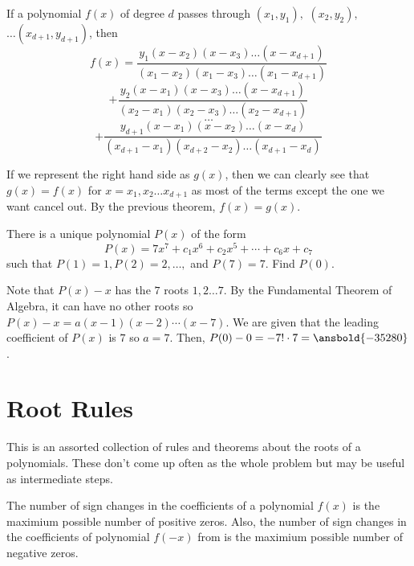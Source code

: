 \documentclass{article}
\begin{document}
\begin{theo}
If a polynomial $f(x)$ of degree $d$ passes through $(x_{1},y_{1}),$ $(x_{2},y_{2}),$ $\ldots (x_{d+1},y_{d+1})$, then
$$f(x)=\frac{y_{1}(x-x_{2})(x-x_{3})\ldots (x-x_{d+1})}{(x_{1}-x_{2})(x_{1}-x_{3})\ldots (x_{1}-x_{d+1})}$$
$$+\frac{y_{2}(x-x_{1})(x-x_{3})\ldots (x-x_{d+1})}{(x_{2}-x_{1})(x_{2}-x_{3})\ldots (x_{2}-x_{d+1})}$$
$$\ldots$$
$$+\frac{y_{d+1}(x-x_{1})(x-x_{2})\ldots (x-x_{d})}{(x_{d+1}-x_{1})(x_{d+2}-x_{2})\ldots (x_{d+1}-x_{d})}$$
\end{theo}

\begin{pro}
If we represent the right hand side as $g(x)$, then we can clearly see that $g(x)=f(x)$ for $x=x_{1},x_{2}\ldots x_{d+1}$ as most of the terms except the one we want cancel out. By the previous theorem, $f(x)=g(x)$.
\end{pro}

\begin{exam}[Mandelbrot]
There is a unique polynomial $P(x)$ of the form 
$$P(x)=7x^7+c_{1}x^6+c_{2}x^{5}+\cdots + c_{6}x+c_{7}$$
such that $P(1)=1,P(2)=2, \ldots,$ and $P(7)=7$. Find $P(0)$.
\end{exam}

\begin{sol}
Note that $P(x)-x$ has the $7$ roots $1,2\ldots 7$. By the Fundamental Theorem of Algebra, it can have no other roots so $P(x)-x=a(x-1)(x-2)\cdots(x-7)$. We are given that the leading coefficient of $P(x)$ is $7$ so $a=7$. Then, $P(0)-0=-7!\cdot 7 = \ansbold{-35280}$.
\end{sol}

\newpage
\section{Root Rules}
This is an assorted collection of rules and theorems about the roots of a polynomials. These don't come up often as the whole problem but may be useful as intermediate steps. 
\begin{theo}
The number of sign changes in the coefficients of a polynomial $f(x)$ is the maximium possible number of positive zeros. Also, the number of sign changes in the coefficients of polynomial $f(-x)$ from is the maximium possible number of negative zeros.
\end{theo}
\end{document}
